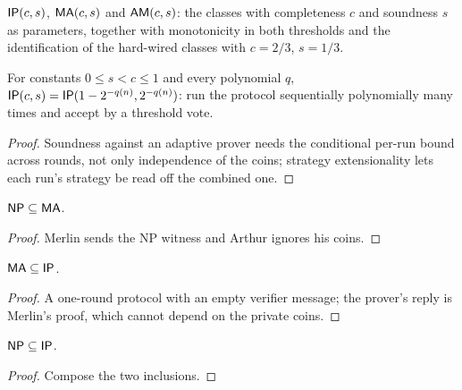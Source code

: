 \begin{definition}
  \label{def:interaction-ip-params}
  $\mathsf{IP}(c, s)$, $\mathsf{MA}(c, s)$ and $\mathsf{AM}(c, s)$: the classes with
  completeness $c$ and soundness $s$ as parameters, together with monotonicity
  in both thresholds and the identification of the hard-wired classes with
  $c = 2/3$, $s = 1/3$.
\end{definition}

\begin{theorem}
  \label{thm:interaction-sequential-repetition}
  For constants $0 \le s < c \le 1$ and every polynomial $q$,
  $\mathsf{IP}(c, s) = \mathsf{IP}(1 - 2^{-q(n)}, 2^{-q(n)})$: run the protocol
  sequentially polynomially many times and accept by a threshold vote.
\end{theorem}
\begin{proof}
  Soundness against an adaptive prover needs the conditional per-run bound
  across rounds, not only independence of the coins; strategy extensionality
  lets each run's strategy be read off the combined one.
\end{proof}

\begin{proposition}[$\cc{NP} \subseteq \cc{MA}$]
  \label{prop:interaction-np-subset-ma}
  $\cc{NP} \subseteq \cc{MA}$.
\end{proposition}
\begin{proof}
  Merlin sends the NP witness and Arthur ignores his coins.
\end{proof}

\begin{proposition}[$\cc{MA} \subseteq \cc{IP}$]
  \label{prop:interaction-ma-subset-ip}
  $\cc{MA} \subseteq \cc{IP}$.
\end{proposition}
\begin{proof}
  A one-round protocol with an empty verifier message; the prover's reply is
  Merlin's proof, which cannot depend on the private coins.
\end{proof}

\begin{corollary}[$\cc{NP} \subseteq \cc{IP}$]
  \label{cor:interaction-np-subset-ip}
  $\cc{NP} \subseteq \cc{IP}$.
\end{corollary}
\begin{proof}
  Compose the two inclusions.
\end{proof}

